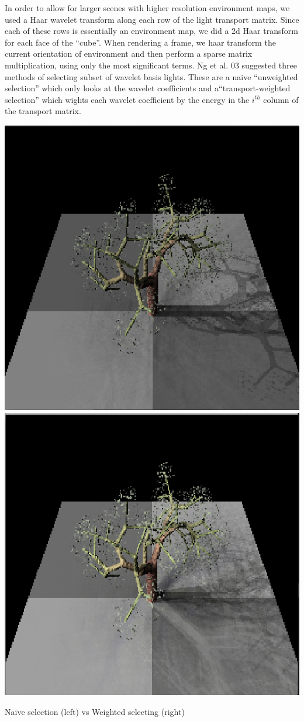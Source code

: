 \documentclass[11pt]{article}
\begin{document}
In order to allow for larger scenes with higher resolution environment maps, we
used a Haar wavelet transform along each row of the light transport matrix.
Since each of these rows is essentially an environment map, we did a 2d Haar
transform for each face of the ``cube''. When rendering a frame, we haar
transform the current orientation of environment and then perform a sparse
matrix multiplication, using only the most significant terms. Ng et al. 03
suggested three methods of selecting subset of wavelet basis lights. These are
a naive ``unweighted selection'' which only looks at the wavelet coefficients and
a``transport-weighted selection'' which wights each wavelet coefficient by the
energy in the $i^{th}$ column of the transport matrix.

\begin{table}
  \centering
  \includegraphics[width=.4\linewidth]{figs/naive}
  \includegraphics[width=.4\linewidth]{figs/weighted}
  \caption{Naive selection (left) vs Weighted selecting (right)}
\end{table}
\end{document}
